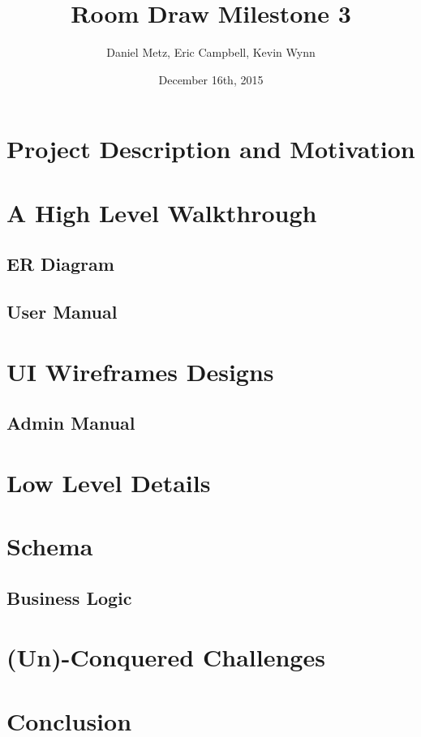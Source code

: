 \documentclass{article}
\title{Room Draw Milestone 3}
\author{Daniel Metz, Eric Campbell, Kevin Wynn}
\date{December 16th, 2015}
\begin{document}
\maketitle

\section{Project Description and Motivation}


% 

\section{A High Level Walkthrough}
  \subsection{ER Diagram}
  

  \subsection{User Manual}
  \section{UI Wireframes Designs}
  

  \subsection{Admin Manual}

\section{Low Level Details}
  \section{Schema}
  

  \subsection{Business Logic}
  

\section{(Un)-Conquered Challenges}

\section{Conclusion}
\end{document}
